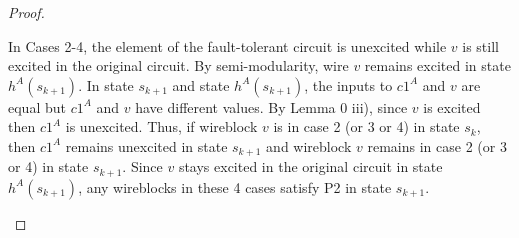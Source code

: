 \documentclass[12pt]{report}
\begin{document}
\begin{proof}
\begin{itemize}
\begin{itemize}
In Cases 2-4, the element of the fault-tolerant circuit is unexcited while $v$ is still excited in the original circuit.  By semi-modularity, wire $v$ remains excited in state $h^A(s_{k+1})$.  In state $s_{k+1}$ and state $h^A(s_{k+1})$, the inputs to $c1^A$ and $v$ are equal but $c1^A$ and $v$ have different values.  By Lemma 0 iii), since $v$ is excited then $c1^A$ is unexcited.  Thus, if wireblock $v$ is in case 2 (or 3 or 4) in state $s_k$, then $c1^A$ remains unexcited in state $s_{k+1}$ and wireblock $v$ remains in case 2 (or 3 or 4) in state $s_{k+1}$.  
Since $v$ stays excited in the original circuit in state $h^A(s_{k+1})$, any wireblocks in these 4 cases satisfy P2 in state $s_{k+1}$.




\end{itemize}
\end{itemize}
\end{proof}
\end{document}
